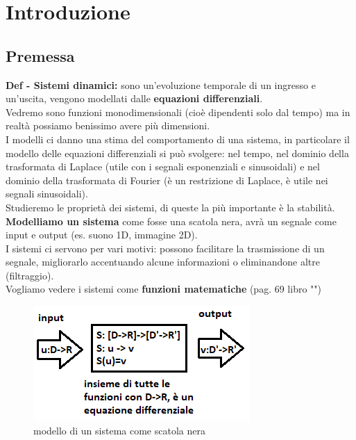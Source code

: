 \chapter{Introduzione}
\section{ Premessa }

\textbf{Def - Sistemi dinamici:}  sono un'evoluzione temporale di un ingresso e un'uscita, vengono modellati dalle \textbf{equazioni differenziali}.\\
Vedremo sono funzioni monodimensionali (cioè dipendenti solo dal tempo) ma in realtà possiamo benissimo avere più dimensioni.\\
I modelli ci danno una stima del comportamento di una sistema, in particolare il modello delle equazioni differenziali si può svolgere: nel tempo, nel dominio della trasformata di Laplace (utile con i segnali esponenziali e sinusoidali) e nel dominio della trasformata di Fourier (è un restrizione di Laplace, è utile nei segnali sinusoidali).\\
Studieremo le proprietà dei sistemi, di queste la più importante è la stabilità.\\
\textbf{Modelliamo un sistema} come fosse una scatola nera, avrà un segnale come input e output (es. suono 1D, immagine 2D).\\
I sistemi ci servono per vari motivi: possono facilitare la trasmissione di un segnale, migliorarlo accentuando alcune informazioni o eliminandone altre (filtraggio).\\
Vogliamo vedere i sistemi come \textbf{funzioni matematiche} (pag. 69 libro "")\\

\begin{figure}
	\centering
	\includegraphics[width=0.7\linewidth]{immagini/sistema}
	\caption{ modello di un sistema come scatola nera}
	\label{fig:sistema}
\end{figure}



